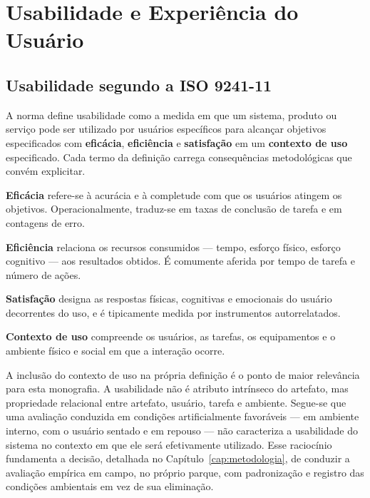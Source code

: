 \section{Usabilidade e Experiência do Usuário}
\label{sec:usabilidade_ux}

\subsection{Usabilidade segundo a ISO 9241-11}

A norma  define usabilidade como a medida em que um
sistema, produto ou serviço pode ser utilizado por usuários específicos para
alcançar objetivos especificados com \textbf{eficácia}, \textbf{eficiência} e
\textbf{satisfação} em um \textbf{contexto de uso} especificado. Cada termo da
definição carrega consequências metodológicas que convém explicitar.

\begin{alineas}
  \item \textbf{Eficácia} refere-se à acurácia e à completude com que os usuários
  atingem os objetivos. Operacionalmente, traduz-se em taxas de conclusão de
  tarefa e em contagens de erro.

  \item \textbf{Eficiência} relaciona os recursos consumidos --- tempo, esforço
  físico, esforço cognitivo --- aos resultados obtidos. É comumente aferida por
  tempo de tarefa e número de ações.

  \item \textbf{Satisfação} designa as respostas físicas, cognitivas e emocionais
  do usuário decorrentes do uso, e é tipicamente medida por instrumentos
  autorrelatados.

  \item \textbf{Contexto de uso} compreende os usuários, as tarefas, os
  equipamentos e o ambiente físico e social em que a interação ocorre.
\end{alineas}

A inclusão do contexto de uso na própria definição é o ponto de maior relevância
para esta monografia. A usabilidade não é atributo intrínseco do artefato, mas
propriedade relacional entre artefato, usuário, tarefa e ambiente. Segue-se que
uma avaliação conduzida em condições artificialmente favoráveis --- em ambiente
interno, com o usuário sentado e em repouso --- não caracteriza a usabilidade do
sistema no contexto em que ele será efetivamente utilizado. Esse raciocínio
fundamenta a decisão, detalhada no Capítulo~\ref{cap:metodologia}, de conduzir a
avaliação empírica em campo, no próprio parque, com padronização e registro das
condições ambientais em vez de sua eliminação.


